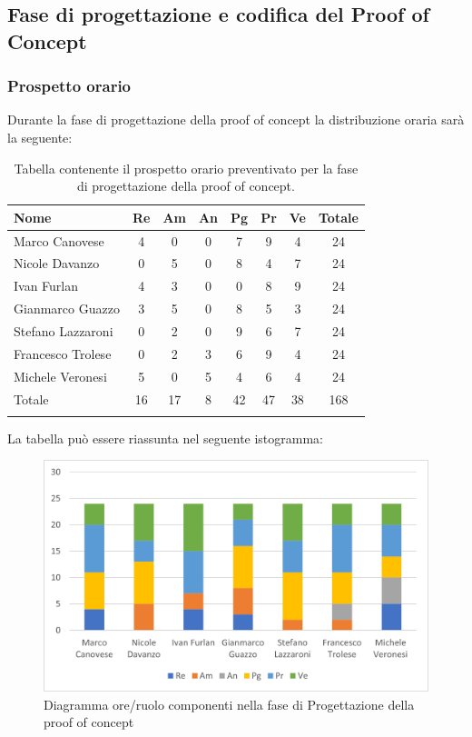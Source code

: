 			\subsection{Fase di progettazione e codifica del Proof of Concept}
            \subsubsection{Prospetto orario}
			Durante la fase di progettazione della proof of concept la distribuzione oraria sarà la seguente:
			
			\begin{longtable}{|l|c|c|c|c|c|c|c|}
				\hline
				\rowcolor{lighter-grayer}
				\textbf{Nome} & \textbf{Re} & \textbf{Am} & \textbf{An} & \textbf{Pg}  & \textbf{Pr}   & \textbf{Ve} & \textbf{Totale} \\
				\hline
				\endfirsthead
				
				\hline
				Marco Canovese & 4& 0 & 0 & 7 & 9 & 4 & 24\\
				\hline
				\hline
				Nicole Davanzo & 0 & 5 & 0 & 8 & 4 & 7 & 24\\
				\hline
				\hline
				Ivan Furlan & 4 & 3 & 0 & 0 & 8 & 9 & 24\\
				\hline
				\hline
				Gianmarco Guazzo & 3 & 5 & 0 & 8 & 5 & 3 & 24\\
				\hline
				\hline
				Stefano Lazzaroni & 0 & 2 & 0 & 9 & 6 & 7 & 24\\
				\hline
				\hline
				Francesco Trolese & 0 & 2 & 3 & 6 & 9 & 4 & 24\\
				\hline
				\hline
				Michele Veronesi & 5 & 0 & 5 & 4 & 6 & 4 & 24\\
				\hline 
				\hline
				Totale & 16 & 17 & 8 & 42 & 47 & 38 & 168\\
				\hline 
				\rowcolor{white}
				\caption{Tabella contenente il prospetto orario preventivato per la fase di progettazione della proof of concept.}
			\end{longtable}

		
			La tabella può essere riassunta nel seguente istogramma:
		
			\begin{figure}[H]
				\centering
				\includegraphics[width=0.8\linewidth]{res/images/preventivo/4-1.png}
				\caption{Diagramma ore/ruolo componenti nella fase di Progettazione della proof of concept}
				\label{fig:diagramma suddivisione ruoli fase progettazione della proof of concept}
			\end{figure}
		
